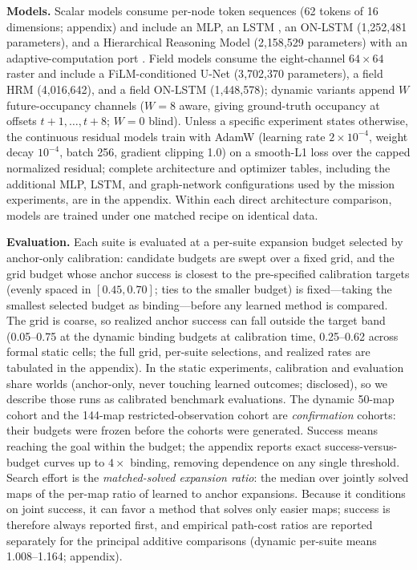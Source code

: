 \documentclass[letterpaper]{article} %
\begin{document}
\textbf{Models.} Scalar models consume per-node token sequences (62 tokens of 16 dimensions; appendix) and include an MLP, an LSTM \citep{hochreiter1997lstm}, an ON-LSTM \citep{shen2019onlstm} (1{,}252{,}481 parameters), and a Hierarchical Reasoning Model \citep[HRM;][]{wang2025hrm} (2{,}158{,}529 parameters) with an adaptive-computation port \citep{graves2016act,banino2021pondernet}. Field models consume the eight-channel $64{\times}64$ raster and include a FiLM-conditioned U-Net \citep{ronneberger2015unet,perez2018film} (3{,}702{,}370 parameters), a field HRM (4{,}016{,}642), and a field ON-LSTM (1{,}448{,}578); dynamic variants append $W$ future-occupancy channels ($W{=}8$ aware, giving ground-truth occupancy at offsets $t{+}1,\ldots,t{+}8$; $W{=}0$ blind). Unless a specific experiment states otherwise, the continuous residual models train with AdamW (learning rate $2{\times}10^{-4}$, weight decay $10^{-4}$, batch 256, gradient clipping 1.0) on a smooth-L1 loss over the capped normalized residual; complete architecture and optimizer tables, including the additional MLP, LSTM, and graph-network configurations used by the mission experiments, are in the appendix. Within each direct architecture comparison, models are trained under one matched recipe on identical data.

\textbf{Evaluation.} Each suite is evaluated at a per-suite expansion budget selected by anchor-only calibration: candidate budgets are swept over a fixed grid, and the grid budget whose anchor success is closest to the pre-specified calibration targets (evenly spaced in $[0.45, 0.70]$; ties to the smaller budget) is fixed---taking the smallest selected budget as binding---before any learned method is compared. The grid is coarse, so realized anchor success can fall outside the target band (0.05--0.75 at the dynamic binding budgets at calibration time, 0.25--0.62 across formal static cells; the full grid, per-suite selections, and realized rates are tabulated in the appendix). In the static experiments, calibration and evaluation share worlds (anchor-only, never touching learned outcomes; disclosed), so we describe those runs as calibrated benchmark evaluations. The dynamic 50-map cohort and the 144-map restricted-observation cohort are \emph{confirmation} cohorts: their budgets were frozen before the cohorts were generated. Success means reaching the goal within the budget; the appendix reports exact success-versus-budget curves up to $4\times$ binding, removing dependence on any single threshold. Search effort is the \emph{matched-solved expansion ratio}: the median over jointly solved maps of the per-map ratio of learned to anchor expansions. Because it conditions on joint success, it can favor a method that solves only easier maps; success is therefore always reported first, and empirical path-cost ratios are reported separately for the principal additive comparisons (dynamic per-suite means 1.008--1.164; appendix).
\end{document}
